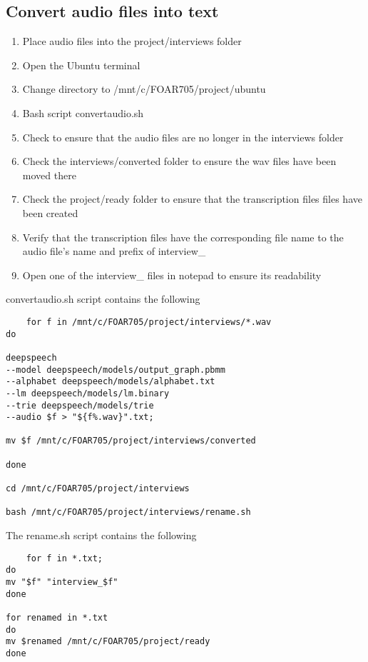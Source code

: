 \documentclass{article}
\begin{document}
\subsection{Convert audio files into text}
\begin{enumerate}
    \item Place audio files into the project/interviews folder
    \item Open the Ubuntu terminal
    \item Change directory to /mnt/c/FOAR705/project/ubuntu
    \item Bash script convertaudio.sh
    \item Check to ensure that the audio files are no longer in the interviews folder
    \item Check the interviews/converted folder to ensure the wav files have been moved there
    \item Check the project/ready folder to ensure that the transcription files files have been created
    \item Verify that the transcription files have the corresponding file name to the audio file's name and prefix of interview\_
    \item Open one of the interview\_ files in notepad to ensure its readability
\end{enumerate}
convertaudio.sh script contains the following
\begin{verbatim}
    for f in /mnt/c/FOAR705/project/interviews/*.wav
do

deepspeech 
--model deepspeech/models/output_graph.pbmm 
--alphabet deepspeech/models/alphabet.txt 
--lm deepspeech/models/lm.binary 
--trie deepspeech/models/trie 
--audio $f > "${f%.wav}".txt;

mv $f /mnt/c/FOAR705/project/interviews/converted

done

cd /mnt/c/FOAR705/project/interviews

bash /mnt/c/FOAR705/project/interviews/rename.sh
\end{verbatim}
The rename.sh script contains the following
\begin{verbatim}
    for f in *.txt;
do
mv "$f" "interview_$f"
done

for renamed in *.txt
do
mv $renamed /mnt/c/FOAR705/project/ready
done

\end{verbatim}
\end{document}
